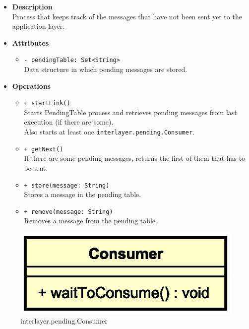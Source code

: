 \FloatBarrier
\begin{itemize}
  \item \textbf{Description} \\
    Process that keeps track of the messages that have not been sent yet to
    the application layer.
  \item \textbf{Attributes}
    \begin{itemize}
      \item \texttt{- pendingTable: Set<String>} \\
    Data structure in which pending messages are stored.
    \end{itemize}
  \item \textbf{Operations}
  \begin{itemize}
    \item \texttt{+ startLink()} \\
    Starts PendingTable process and retrieves pending messages from last
    execution (if there are some). \\
    Also starts at least one \texttt{interlayer.pending.Consumer}.
    \item \texttt{+ getNext()} \\
    If there are some pending messages, returns the first of them that has to
    be sent.
    \item \texttt{+ store(message: String)} \\
    Stores a message in the pending table.
    \item \texttt{+ remove(message: String)} \\
    Removes a message from the pending table.
  \end{itemize}
\end{itemize}


\begin{figure}[H]
  \centering
  \includegraphics[width=.4\columnwidth]{images/solution/mw/int/cons.eps}
  \caption{interlayer.pending.Consumer}
  \label{fig:mw-interlayer-pending-consumer}
\end{figure}

